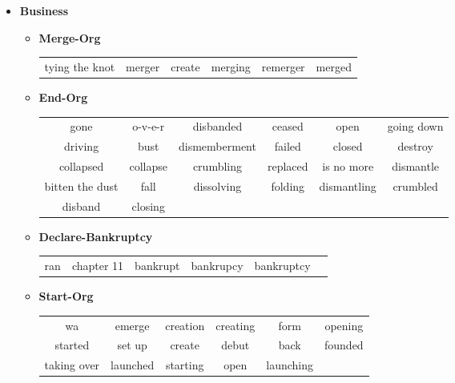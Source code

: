 \documentclass[11pt, oneside]{article}   	%
\begin{document}
\begin{itemize}
\clearpage
\item[] \textbf{Business} 
	\vspace*{-0.2cm}
	\begin{itemize}
	\item[] \textbf{Merge-Org} \\
		 \begin{tabular}{ c c c c c c }
		 tying the knot & merger & create & merging & remerger & merged
		\end{tabular}
	\item[] \textbf{End-Org} \\
		 \begin{tabular}{ c c c c c c }
		 gone & o-v-e-r & disbanded & ceased & open & going down\\driving & bust & dismemberment & failed & closed & destroy\\collapsed & collapse & crumbling & replaced & is no more & dismantle\\bitten the dust & fall & dissolving & folding & dismantling & crumbled\\disband & closing

		\end{tabular}
	\item[] \textbf{Declare-Bankruptcy} \\
		 \begin{tabular}{ c c c c c c }
		 ran & chapter 11 & bankrupt & bankrupcy & bankruptcy
		\end{tabular}
	\item[] \textbf{Start-Org} \\
		 \begin{tabular}{ c c c c c c }
		 wa & emerge & creation & creating & form & opening\\started & set up & create & debut & back & founded\\taking over & launched & starting & open & launching
		\end{tabular}
	\end{itemize}


\end{itemize}
\end{document}
